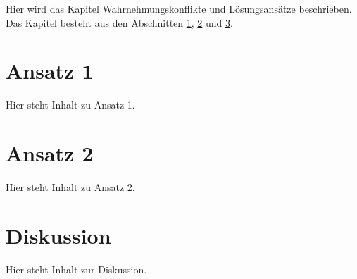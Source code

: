 Hier wird das Kapitel Wahrnehmungskonflikte und Lösungsansätze beschrieben. Das Kapitel besteht aus den Abschnitten  \ref{sec:ansatz_1}, \ref{sec:ansatz_2} und \ref{sec:diskussion_wahrnehmungskonflikte}.


\section{Ansatz 1}
\label{sec:ansatz_1}

Hier steht Inhalt zu Ansatz 1.


\section{Ansatz 2}
\label{sec:ansatz_2}

Hier steht Inhalt zu Ansatz 2.


\section{Diskussion}
\label{sec:diskussion_wahrnehmungskonflikte}

Hier steht Inhalt zur Diskussion.